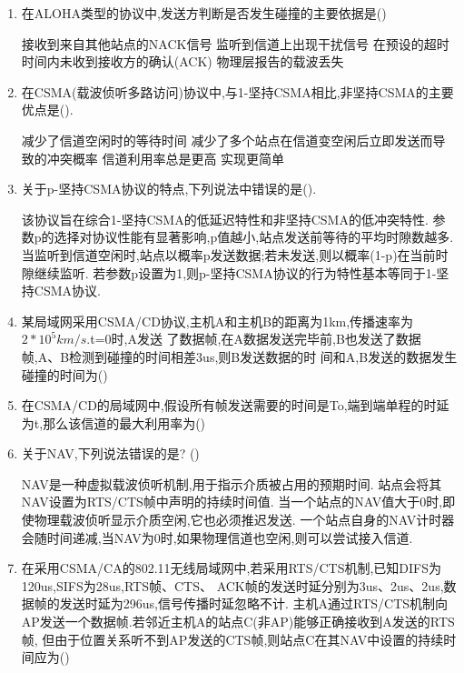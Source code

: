 \documentclass[12pt, a4paper, oneside, UTF8]{ctexbook}
\begin{document}
\begin{enumerate}
    \item  在ALOHA类型的协议中,发送方判断是否发生碰撞的主要依据是()
    \begin{choices}[1]
    \task 接收到来自其他站点的NACK信号
    \task 监听到信道上出现干扰信号
    \task 在预设的超时时间内未收到接收方的确认(ACK)
    \task 物理层报告的载波丢失
    \end{choices}

    \item 在CSMA(载波侦听多路访问)协议中,与1-坚持CSMA相比,非坚持CSMA的主要优点是().
    \begin{choices}[1]
    \task 减少了信道空闲时的等待时间
    \task 减少了多个站点在信道变空闲后立即发送而导致的冲突概率
    \task 信道利用率总是更高
    \task 实现更简单
    \end{choices}

    \item  关于p-坚持CSMA协议的特点,下列说法中错误的是().
    \begin{choices}[1]
    \task 该协议旨在综合1-坚持CSMA的低延迟特性和非坚持CSMA的低冲突特性.
    \task 参数p的选择对协议性能有显著影响,p值越小,站点发送前等待的平均时隙数越多.
    \task 当监听到信道空闲时,站点以概率p发送数据;若未发送,则以概率(1-p)在当前时隙继续监听.
    \task 若参数p设置为1,则p-坚持CSMA协议的行为特性基本等同于1-坚持CSMA协议.
    \end{choices}

    \item 某局域网采用CSMA/CD协议,主机A和主机B的距离为1km,传播速率为$2*10^5km/s$.t=0时,A发送
    了数据帧,在A数据发送完毕前,B也发送了数据帧,A、B检测到碰撞的时间相差3us,则B发送数据的时
    间和A,B发送的数据发生碰撞的时间为(\qquad)

    \item 在CSMA/CD的局域网中,假设所有帧发送需要的时间是To,端到端单程的时延为t,那么该信道的最大利用率为(\qquad)

    \item 关于NAV,下列说法错误的是? (\qquad)
    \begin{choices}[1]
    \task NAV是一种虚拟载波侦听机制,用于指示介质被占用的预期时间.
    \task 站点会将其NAV设置为RTS/CTS帧中声明的持续时间值.
    \task 当一个站点的NAV值大于0时,即使物理载波侦听显示介质空闲,它也必须推迟发送.
    \task 一个站点自身的NAV计时器会随时间递减,当NAV为0时,如果物理信道也空闲,则可以尝试接入信道.
    \end{choices}

    \item 在采用CSMA/CA的802.11无线局域网中,若采用RTS/CTS机制,已知DIFS为120us,SIFS为28us,RTS帧、CTS、
    ACK帧的发送时延分别为3us、2us、2us,数据帧的发送时延为296us,信号传播时延忽略不计.
    主机A通过RTS/CTS机制向AP发送一个数据帧.若邻近主机A的站点C(非AP)能够正确接收到A发送的RTS帧,
    但由于位置关系听不到AP发送的CTS帧,则站点C在其NAV中设置的持续时间应为(\qquad)


\end{enumerate}
\end{document}
